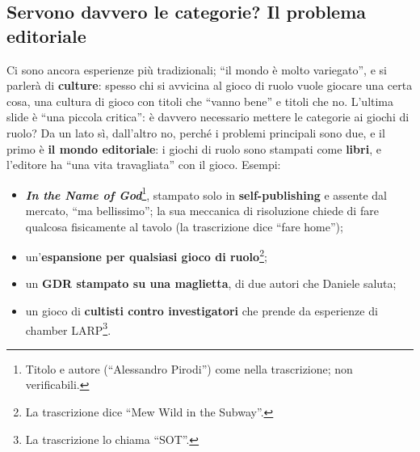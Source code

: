 \subsection{Servono davvero le categorie? Il problema editoriale}

Ci sono ancora esperienze più tradizionali; ``il mondo è molto variegato'', e si
parlerà di \textbf{culture}: spesso chi si avvicina al gioco di ruolo vuole
giocare una certa cosa, una cultura di gioco con titoli che ``vanno bene'' e
titoli che no. L'ultima slide è ``una piccola critica'': è davvero necessario
mettere le categorie ai giochi di ruolo? Da un lato sì, dall'altro no, perché i
problemi principali sono due, e il primo è \textbf{il mondo editoriale}: i giochi
di ruolo sono stampati come \textbf{libri}, e l'editore ha ``una vita travagliata''
con il gioco. Esempi:
\begin{itemize}
  \item \textbf{\emph{In the Name of God}}\footnote{Titolo e autore (``Alessandro
        Pirodi'') come nella trascrizione; non verificabili.}, stampato solo in
        \textbf{self-publishing} e assente dal mercato, ``ma bellissimo''; la sua
        meccanica di risoluzione chiede di fare qualcosa fisicamente al tavolo
        (la trascrizione dice ``fare home'');
  \item un'\textbf{espansione per qualsiasi gioco di ruolo}\footnote{La
        trascrizione dice ``Mew Wild in the Subway''.};
  \item un \textbf{GDR stampato su una maglietta}, di due autori che Daniele
        saluta;
  \item un gioco di \textbf{cultisti contro investigatori} che prende da
        esperienze di chamber LARP\footnote{La trascrizione lo chiama ``SOT''.}.
\end{itemize}

